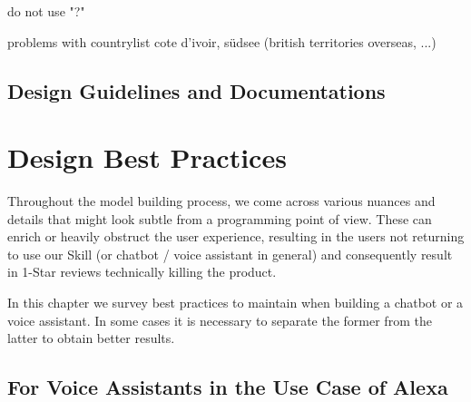 do not use "?"


problems with countrylist
cote d'ivoir, südsee (british territories overseas, ...)



\section{Design Guidelines and Documentations}
\label{designGuide}






\chapter{Design Best Practices}
\label{designbestprac}


Throughout the model building process, we come across various nuances and details that might look subtle from a programming point of view. %
These can enrich or %
heavily obstruct the user experience, resulting in the users not returning to use our Skill (or chatbot / voice assistant in general) %
and consequently result in 1-Star reviews technically killing the product.

In this chapter we survey best practices to maintain when building a chatbot or a voice assistant. In some cases it is necessary to separate the former from the latter to obtain better results.


\section{For Voice Assistants in the Use Case of Alexa}
\label{designalexa:bestprac}




